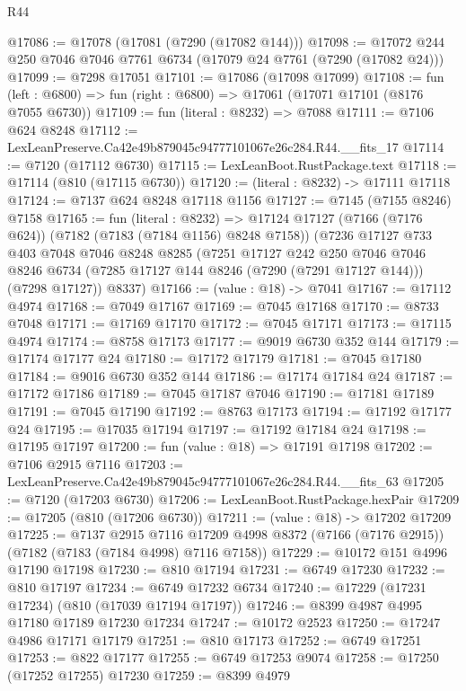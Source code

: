 \begin{lexlean}{R44}
\begin{coremodule}
{@17086 := @17078 (@17081 (@7290 (@17082 @144)))
@17098 := @17072 @244 @250 @7046 @7046 @7761 @6734 (@17079 @24 @7761 (@7290 (@17082 @24)))
@17099 := @7298 @17051
@17101 := @17086 (@17098 @17099)
@17108 := fun (left : @6800) => fun (right : @6800) => @17061 (@17071 @17101 (@8176 @7055 @6730))
@17109 := fun (literal : @8232) => @7088
@17111 := @7106 @624 @8248
@17112 := LexLeanPreserve.Ca42e49b879045c94777101067e26c284.R44.__fits_17
@17114 := @7120 (@17112 @6730)
@17115 := LexLeanBoot.RustPackage.text
@17118 := @17114 (@810 (@17115 @6730))
@17120 := (literal : @8232) -> @17111 @17118
@17124 := @7137 @624 @8248 @17118 @1156
@17127 := @7145 (@7155 @8246) @7158
@17165 := fun (literal : @8232) =>
  @17124
    @17127
    (@7166 (@7176 @624))
    (@7182 (@7183 (@7184 @1156) @8248 @7158))
    (@7236
      @17127
      @733
      @403
      @7048
      @7046
      @8248
      @8285
      (@7251
        @17127
        @242
        @250
        @7046
        @7046
        @8246
        @6734
        (@7285 @17127 @144 @8246 (@7290 (@7291 @17127 @144)))
        (@7298 @17127))
      @8337)
@17166 := (value : @18) -> @7041
@17167 := @17112 @4974
@17168 := @7049 @17167
@17169 := @7045 @17168
@17170 := @8733 @7048
@17171 := @17169 @17170
@17172 := @7045 @17171
@17173 := @17115 @4974
@17174 := @8758 @17173
@17177 := @9019 @6730 @352 @144
@17179 := @17174 @17177 @24
@17180 := @17172 @17179
@17181 := @7045 @17180
@17184 := @9016 @6730 @352 @144
@17186 := @17174 @17184 @24
@17187 := @17172 @17186
@17189 := @7045 @17187 @7046
@17190 := @17181 @17189
@17191 := @7045 @17190
@17192 := @8763 @17173
@17194 := @17192 @17177 @24
@17195 := @17035 @17194
@17197 := @17192 @17184 @24
@17198 := @17195 @17197
@17200 := fun (value : @18) => @17191 @17198
@17202 := @7106 @2915 @7116
@17203 := LexLeanPreserve.Ca42e49b879045c94777101067e26c284.R44.__fits_63
@17205 := @7120 (@17203 @6730)
@17206 := LexLeanBoot.RustPackage.hexPair
@17209 := @17205 (@810 (@17206 @6730))
@17211 := (value : @18) -> @17202 @17209
@17225 := @7137
    @2915
    @7116
    @17209
    @4998
    @8372
    (@7166 (@7176 @2915))
    (@7182 (@7183 (@7184 @4998) @7116 @7158))
@17229 := @10172 @151 @4996 @17190 @17198
@17230 := @810 @17194
@17231 := @6749 @17230
@17232 := @810 @17197
@17234 := @6749 @17232 @6734
@17240 := @17229 (@17231 @17234) (@810 (@17039 @17194 @17197))
@17246 := @8399 @4987 @4995 @17180 @17189 @17230 @17234
@17247 := @10172 @2523
@17250 := @17247 @4986 @17171 @17179
@17251 := @810 @17173
@17252 := @6749 @17251
@17253 := @822 @17177
@17255 := @6749 @17253 @9074
@17258 := @17250 (@17252 @17255) @17230
@17259 := @8399 @4979
}
\end{coremodule}
\end{lexlean}
